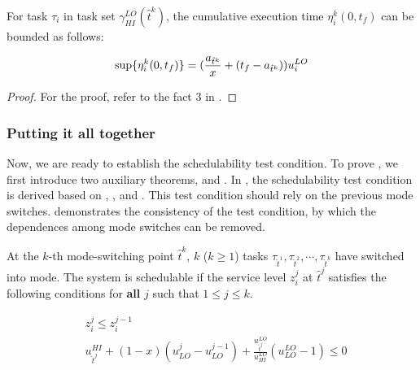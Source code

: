 \documentclass[10pt,journal,compsoc]{IEEEtran}
\begin{document}
\begin{lemma}
\label{lem:hi1}
For \hi task $\tau_i$ in task set $\gamma_{HI}^{LO}(\hat{t}^k)$, the cumulative execution time $\eta_{i}^k(0,t_f)$ can be bounded as follows:
\begin{small}
\begin{align}
\label{eq:hi1}
\sup\{\eta_{i}^k(0,t_f)\} = (\frac{a_{\hat{t}^k}}{x}+(t_f-a_{\hat{t}^k}))u_{i}^{LO}
\end{align}
\end{small}
\end{lemma}
\begin{proof}
For the proof, refer to the fact 3 in \cite{Baruah2012}. 
\end{proof}

\subsubsection{\textbf{Putting it all together}}
\label{sec:pia}
Now, we are ready to establish the schedulability test condition. To prove , we first introduce two auxiliary theorems,  and . In , the schedulability test condition is derived based on , , and . This test condition should rely on the previous mode switches.  demonstrates the consistency of the test condition, by which the dependences among mode switches can be removed.     

\begin{theorem}
\label{thm:1}
At the $k$-th mode-switching point $\hat{t}^{k}$, $k$ ($k\ge{}1$) \hi tasks $\tau_{\hat{t}^{1}},\tau_{\hat{t}^{2}},\cdots,\tau_{\hat{t}^{k}}$ have switched into \hi mode. 
The system is schedulable if the service level $z_i^j$ at $\hat{t}^{j}$ satisfies the following conditions for \textbf{all} $j$ such that $1\le{j}\le{k}$. 
\begin{footnotesize}  
\begin{align}
\label{eq:thm3:m3}
&z_i^{j}\le{z_i^{j-1}}\\
\label{eq:thm3:m2}
&u_{\hat{t}^j}^{HI}+(1-x)(u_{LO}^{j}-u_{LO}^{j-1})+\frac{u_{\hat{t}^j}^{LO}}{u_{HI}^{LO}}(u_{LO}^{LO}-1)\le{0}
\end{align} 
\end{footnotesize}
\end{theorem}
\end{document}
